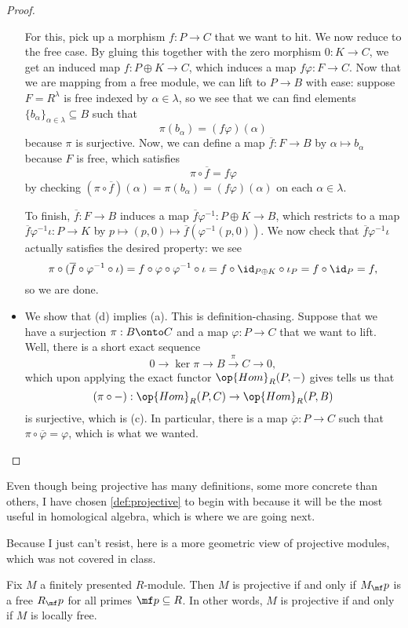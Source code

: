 \begin{proof}
\begin{itemize}
		For this, pick up a morphism $f:P\to C$ that we want to hit. We now reduce to the free case. By gluing this together with the zero morphism $0:K\to C$, we get an induced map $f:P\oplus K\to C$, which induces a map $f\varphi:F\to C$. Now that we are mapping from a free module, we can lift to $P\to B$ with ease: suppose $F=R^\lambda$ is free indexed by $\alpha\in\lambda$, so we see that we can find elements $\{b_\alpha\}_{\alpha\in\lambda}\subseteq B$ such that
		\[\pi(b_\alpha)=(f\varphi)(\alpha)\]
		because $\pi$ is surjective. Now, we can define a map $\overline f:F\to B$ by $\alpha\mapsto b_\alpha$ because $F$ is free, which satisfies
		\[\pi\circ\overline f=f\varphi\]
		by checking $(\pi\circ\overline f)(\alpha)=\pi(b_\alpha)=(f\varphi)(\alpha)$ on each $\alpha\in\lambda$.

		To finish, $\overline f:F\to B$ induces a map $\overline f\varphi^{-1}:P\oplus K\to B$, which restricts to a map $\overline f\varphi^{-1}\iota:P\to K$ by $p\mapsto(p,0)\mapsto\overline f(\varphi^{-1}(p,0))$. We now check that $\overline f\varphi^{-1}\iota$ actually satisfies the desired property: we see
		\[\pi\circ(\overline f\circ\varphi^{-1}\circ\iota)=f\circ\varphi\circ\varphi^{-1}\circ\iota=f\circ\id_{P\oplus K}\circ\iota_P=f\circ\id_P=f,\]
		so we are done.

		\item We show that (d) implies (a). This is definition-chasing. Suppose that we have a surjection $\pi:B\onto C$ and a map $\varphi:P\to C$ that we want to lift. Well, there is a short exact sequence
		\[0\to\ker\pi\to B\stackrel\pi\to C\to 0,\]
		which upon applying the exact functor $\op{Hom}_R(P,-)$ gives tells us that
		\[(\pi\circ-):\op{Hom}_R(P,C)\to\op{Hom}_R(P,B)\]
		is surjective, which is (c). In particular, there is a map $\overline\varphi:P\to C$ such that $\pi\circ\overline\varphi=\varphi$, which is what we wanted.
		\qedhere
	\end{itemize}
\end{proof}
\begin{remark}[Nir]
	Even though being projective has many definitions, some more concrete than others, I have chosen \autoref{def:projective} to begin with because it will be the most useful in homological algebra, which is where we are going next.
\end{remark}
Because I just can't resist, here is a more geometric view of projective modules, which was not covered in class.
\begin{proposition}
	Fix $M$ a finitely presented $R$-module. Then $M$ is projective if and only if $M_\mf p$ is a free $R_\mf p$ for all primes $\mf p\subseteq R$. In other words, $M$ is projective if and only if $M$ is locally free.
\end{proposition}
